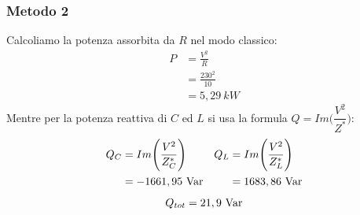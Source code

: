 \documentclass{article}
\begin{document}
\subsubsection*{Metodo 2}
Calcoliamo la potenza assorbita da $R$ nel modo classico:
\begin{align*}
    P &= \frac{V^2}{R}
    \\
    &= \frac{230^2}{10}
    \\
    &= 5,29 \ kW
\end{align*}
Mentre per la potenza reattiva di $C$ ed $L$ si usa la formula $Q = Im \Bigg(\dfrac{V^2}{Z^*}\Bigg)$:
\begin{align*}
    Q_C &= Im \Bigg( \frac{V^2}{Z_C^*}\Bigg) &
    Q_L &= Im \Bigg( \frac{V^2}{Z_L^*}\Bigg)
    \\
    &= -1661,95 \ \text{Var} &
    &= 1683,86 \ \text{Var}
\end{align*}
\[Q_{tot} = 21,9 \ \T{Var}\]
\end{document}
